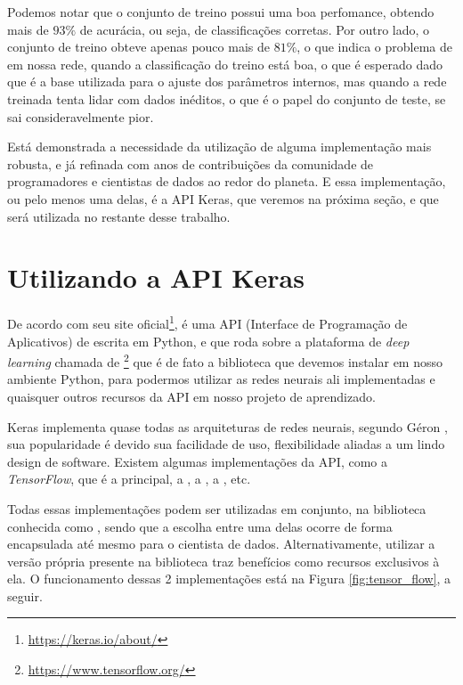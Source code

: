 Podemos notar que o conjunto de treino possui uma boa perfomance, obtendo mais de $93\%$ de acurácia, ou seja, de classificações corretas. Por outro lado, o conjunto de treino obteve apenas pouco mais de $81\%$, o que indica o problema de  em nossa rede, quando a classificação do treino está boa, o que é esperado dado que é a base utilizada para o ajuste dos parâmetros internos, mas quando a rede treinada tenta lidar com dados inéditos, o que é o papel do conjunto de teste, se sai consideravelmente pior.

Está demonstrada a necessidade da utilização de alguma implementação mais robusta, e já refinada com anos de contribuições da comunidade de programadores e cientistas de dados ao redor do planeta. E essa implementação, ou pelo menos uma delas, é a API Keras, que veremos na próxima seção, e que será utilizada no restante desse trabalho.

\section{Utilizando a API Keras}

De acordo com seu site oficial\footnote{\url{https://keras.io/about/}},  é uma API (Interface de Programação de Aplicativos) de  escrita em Python, e que roda sobre a plataforma de \emph{deep learning} chamada de \footnote{\url{https://www.tensorflow.org/}} que é de fato a biblioteca que devemos instalar em nosso ambiente Python, para podermos utilizar as redes neurais ali implementadas e quaisquer outros recursos da API  em nosso projeto de aprendizado.

Keras implementa quase todas as arquiteturas de redes neurais, segundo Géron \citep{hands}, sua popularidade é devido sua facilidade de uso, flexibilidade aliadas a um lindo design de software. Existem algumas implementações da API, como a \emph{TensorFlow}, que é a principal, a , a , a , etc. 

Todas essas implementações podem ser utilizadas em conjunto, na biblioteca conhecida como , sendo que a escolha entre uma delas ocorre de forma encapsulada até mesmo para o cientista de dados. Alternativamente, utilizar a versão própria presente na biblioteca  traz benefícios como recursos exclusivos à ela. O funcionamento dessas 2 implementações está na Figura \ref{fig:tensor_flow}, a seguir.

